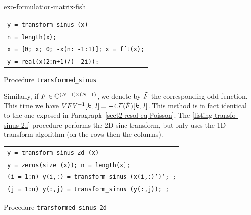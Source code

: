 \begin{correction}{exo-formulation-matrix-fish}
\begin{enumerate}
\begin{listing} 
\begin{footnotesize}
{\upshape
\begin{tabular}{l} \texttt{\pfunction y = transform\_sinus (x)} \\
\texttt{n = length(x);} \\
\texttt{x = [0; x; 0; -x(n: -1:1)]; x = fft(x);} \\
\texttt{y = real(x(2:n+1)/(- 2i));} \\
\end{tabular}
}
\end{footnotesize}
\caption{Procedure \texttt{\upshape transformed\_sinus}}
\label{listing-transfo-sinus}
\end{listing}
Similarly, if $ F \in \mathbb{C}^{(N-1) \times (N-1)} $, we denote by $ \tilde{F} $ the corresponding odd function. This time we have $ VFV^{-1}[k, \, l] = -4 \mathcal{F}(\tilde{F}) [k, \, l] $. This method is in fact identical to the one exposed in Paragraph~\ref{sect2-resol-eq-Poisson}. The \Matlab{} \ref{listing-transfo-sinus-2d} procedure performs the 2D sine transform, but only uses the 1D transform algorithm (on the rows then the columns).

\begin{listing} 
\begin{footnotesize}
 {\upshape
\begin{tabular}{l} \texttt{\pfunction y = transform\_sinus\_2d (x)} \\
\texttt{y = zeros(size (x)); n = length(x);} \\
\texttt{\pfor{}(i = 1:n) y(i,:) = transform\_sinus (x(i,:)')'; \pend{};} \\
\texttt{\pfor{}(j = 1:n) y(:,j) = transform\_sinus (y(:,j)); \pend{};} \\
\end{tabular}
}
\end{footnotesize}
\caption{Procedure \texttt{\upshape transformed\_sinus\_2d}}
\label{listing-transfo-sinus-2d}
\end{listing}
\end{enumerate}
\end{correction}
 
